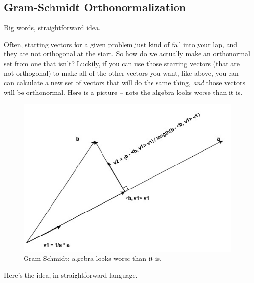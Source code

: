 \documentclass[
]{book}
\begin{document}
\hypertarget{gram-schmidt-orthonormalization-1}{%
\subsection{Gram-Schmidt Orthonormalization}\label{gram-schmidt-orthonormalization-1}}

Big words, straightforward idea.

Often, starting vectors for a given problem just kind of fall into your lap, and they are not orthogonal at the start. So how do we actually make an orthonormal set from one that isn't? Luckily, if you can use those starting vectors (that are not orthogonal) to make all of the other vectors you want, like above, you can can calculate a new set of vectors that will do the same thing, \emph{and} those vectors will be orthonormal. Here is a picture -- note the algebra looks worse than it is.

\begin{figure}

{\centering \includegraphics[width=0.75\linewidth,height=0.75\textheight]{images/gram-schmidt} 

}

\caption{Gram-Schmidt: algebra looks worse than it is.}\label{fig:unnamed-chunk-9}
\end{figure}

Here's the idea, in straightforward language.
\end{document}
